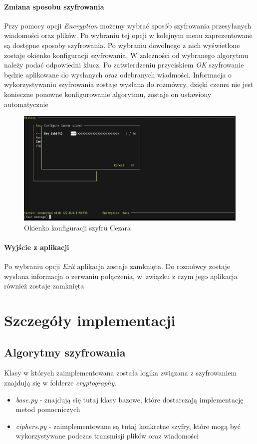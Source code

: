 \documentclass{article}
\begin{document}
    \paragraph{Zmiana sposobu szyfrowania}
      Przy pomocy opcji \emph{Encryption} możemy wybrać sposób szyfrowania przesyłanych wiadomości oraz plików.
      Po wybraniu tej opcji w kolejnym menu zaprezentowane są dostępne sposoby szyfrowania. Po wybraniu dowolnego z
      nich wyświetlone zostaje okienko konfiguracji szyfrowania. W zależności od wybranego algorytmu należy podać
      odpowiedni klucz. Po zatwierdzeniu przyciskiem \emph{OK} szyfrowanie będzie aplikowane do wysłanych oraz
      odebranych wiadmości. Informacja o wykorzystywaniu szyfrowania zostaje wysłana do rozmówcy, dzięki czemu nie
      jest konieczne ponowne konfigurowanie algorytmu, zostaje on ustawiony automatycznie

    \begin{figure}[H]
        \centering
        \includegraphics[scale=0.4]{caesar_cipher_configuration}
        \caption{Okienko konfiguracji szyfru Cezara}
        \label{CIPHER_CONFIGURATION}
    \end{figure}

    \paragraph{Wyjście z aplikacji}
      Po wybraniu opcji \emph{Exit} aplikacja zostaje zamknięta. Do rozmówcy zostaje wysłana informacja o
      zerwaniu połączenia, w~związku z czym jego aplikacja również zostaje zamknięta

  \section{Szczegóły implementacji}
    \subsection{Algorytmy szyfrowania}
    Klasy w których zaimplementowana została logika związana z szyfrowaniem znajdują się w folderze \emph{cryptography}.
    \begin{itemize}
            \item \emph{base.py} - znajdują się tutaj klasy bazowe, które dostarczają implementację metod pomocniczych
            \item \emph{ciphers.py} - zaimplementowane są tutaj konkretne szyfry, które mogą być wykorzystywane podczas
                transmisji plików oraz wiadomości
    \end{itemize}
\end{document}
